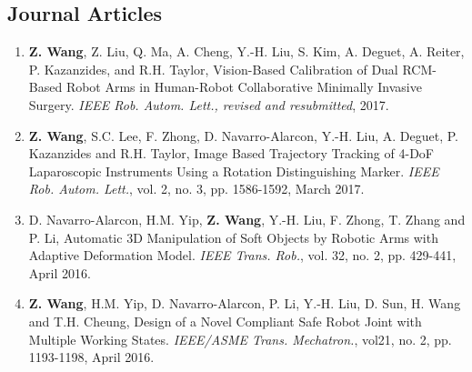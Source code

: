 \documentclass[10pt,letterpaper]{article}
\begin{document}
    \subsection*{Journal Articles}
    \begin{enumerate}
        \item \textbf{Z. Wang}, Z. Liu, Q. Ma, A. Cheng, Y.-H. Liu, S. Kim, A. Deguet, A. Reiter, P. Kazanzides, and R.H. Taylor,
        Vision-Based Calibration of Dual RCM-Based Robot Arms in Human-Robot Collaborative Minimally Invasive Surgery.
        \textit{IEEE Rob. Autom. Lett., revised and resubmitted}, 2017.
        \item \textbf{Z. Wang}, S.C. Lee, F. Zhong, D. Navarro-Alarcon, Y.-H. Liu, A. Deguet, P. Kazanzides and R.H. Taylor,
        Image Based Trajectory Tracking of 4-DoF Laparoscopic Instruments Using a Rotation Distinguishing Marker.
        \textit{IEEE Rob. Autom. Lett.}, vol. 2, no. 3, pp. 1586-1592, March 2017.
        \item D. Navarro-Alarcon, H.M. Yip, \textbf{Z. Wang}, Y.-H. Liu, F. Zhong, T. Zhang and P. Li,
        Automatic 3D Manipulation of Soft Objects by Robotic Arms with Adaptive Deformation Model.
        \textit{{IEEE} Trans. Rob.}, vol. 32, no. 2, pp. 429-441, April 2016.
        \item \textbf{Z. Wang}, H.M. Yip, D. Navarro-Alarcon, P. Li, Y.-H. Liu, D. Sun, H. Wang and T.H. Cheung,
        Design of a Novel Compliant Safe Robot Joint with Multiple Working States.
        \textit{{IEEE/ASME} Trans. Mechatron.}, vol21, no. 2, pp. 1193-1198, April 2016.
    \end{enumerate}
\end{document}
